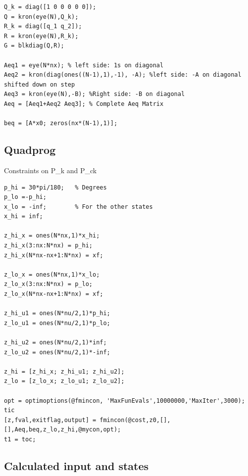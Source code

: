 \documentclass[11pt,a4paper,USenglish]{article} %
\begin{document}
\begin{verbatim}
Q_k = diag([1 0 0 0 0 0]);
Q = kron(eye(N),Q_k);
R_k = diag([q_1 q_2]);
R = kron(eye(N),R_k);
G = blkdiag(Q,R);

Aeq1 = eye(N*nx); % left side: 1s on diagonal
Aeq2 = kron(diag(ones((N-1),1),-1), -A); %left side: -A on diagonal shifted down on step
Aeq3 = kron(eye(N),-B); %Right side: -B on diagonal
Aeq = [Aeq1+Aeq2 Aeq3]; % Complete Aeq Matrix

beq = [A*x0; zeros(nx*(N-1),1)];
\end{verbatim}


\subsection*{Quadprog}

\begin{par}
Constraints on P\_k and P\_ck
\end{par} \vspace{1em}
\begin{verbatim}
p_hi = 30*pi/180;   % Degrees
p_lo =-p_hi;
x_lo = -inf;        % For the other states
x_hi = inf;

z_hi_x = ones(N*nx,1)*x_hi;
z_hi_x(3:nx:N*nx) = p_hi;
z_hi_x(N*nx-nx+1:N*nx) = xf;

z_lo_x = ones(N*nx,1)*x_lo;
z_lo_x(3:nx:N*nx) = p_lo;
z_lo_x(N*nx-nx+1:N*nx) = xf;

z_hi_u1 = ones(N*nu/2,1)*p_hi;
z_lo_u1 = ones(N*nu/2,1)*p_lo;

z_hi_u2 = ones(N*nu/2,1)*inf;
z_lo_u2 = ones(N*nu/2,1)*-inf;

z_hi = [z_hi_x; z_hi_u1; z_hi_u2];
z_lo = [z_lo_x; z_lo_u1; z_lo_u2];

opt = optimoptions(@fmincon, 'MaxFunEvals',10000000,'MaxIter',3000);
tic
[z,fval,exitflag,output] = fmincon(@cost,z0,[],[],Aeq,beq,z_lo,z_hi,@mycon,opt);
t1 = toc;
\end{verbatim}


\subsection*{Calculated input and states}
\end{document}
